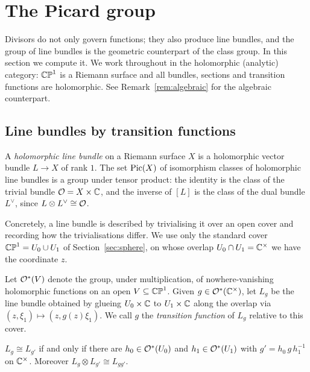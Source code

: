 \section{The Picard group}\label{sec:pic}

Divisors do not only govern functions; they also produce line bundles, and the
group of line bundles is the geometric counterpart of the class group. In this
section we compute it. We work throughout in the holomorphic (analytic) category:
$\mathbb{CP}^1$ is a Riemann surface and all bundles, sections and transition functions are
holomorphic. See Remark~\ref{rem:algebraic} for the algebraic counterpart.

\subsection{Line bundles by transition functions}

\begin{definition}
A \emph{holomorphic line bundle} on a Riemann surface $X$ is a holomorphic vector
bundle $L \to X$ of rank $1$. The set $\operatorname{Pic}(X)$ of isomorphism classes of
holomorphic line bundles is a group under tensor product: the identity is the
class of the trivial bundle $\mathcal{O} = X \times \mathbb{C}$, and the inverse of $[L]$ is
the class of the dual bundle $L^{\vee}$, since $L \otimes L^{\vee} \cong \mathcal{O}$.
\end{definition}

Concretely, a line bundle is described by trivialising it over an open cover and
recording how the trivialisations differ. We use only the standard cover
$\mathbb{CP}^1 = U_0 \cup U_1$ of Section~\ref{sec:sphere}, on whose overlap
$U_0 \cap U_1 = \mathbb{C}^\times$ we have the coordinate $z$.

\begin{definition}\label{def:cocycle}
Let $\mathcal{O}^\ast(V)$ denote the group, under multiplication, of nowhere-vanishing
holomorphic functions on an open $V \subseteq \mathbb{CP}^1$. Given
$g \in \mathcal{O}^\ast(\mathbb{C}^\times)$, let $L_g$ be the line bundle obtained by glueing
$U_0 \times \mathbb{C}$ to $U_1 \times \mathbb{C}$ along the overlap via
$(z, \xi_1) \mapsto (z, g(z)\xi_1)$. We call $g$ the \emph{transition function}
of $L_g$ relative to this cover.
\end{definition}

\begin{smjlemma}\label{lem:cocycleiso}
$L_g \cong L_{g'}$ if and only if there are $h_0 \in \mathcal{O}^\ast(U_0)$ and
$h_1 \in \mathcal{O}^\ast(U_1)$ with $g' = h_0\, g\, h_1^{-1}$ on $\mathbb{C}^\times$.
Moreover $L_g \otimes L_{g'} \cong L_{gg'}$.
\end{smjlemma}

